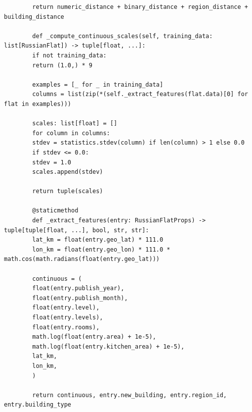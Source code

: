 \documentclass[12pt,a4paper]{article}
\begin{document}
\begin{lstlisting}
		return numeric_distance + binary_distance + region_distance + building_distance
		
		def _compute_continuous_scales(self, training_data: list[RussianFlat]) -> tuple[float, ...]:
		if not training_data:
		return (1.0,) * 9
		
		examples = [_ for _ in training_data]
		columns = list(zip(*(self._extract_features(flat.data)[0] for flat in examples)))
		
		scales: list[float] = []
		for column in columns:
		stdev = statistics.stdev(column) if len(column) > 1 else 0.0
		if stdev <= 0.0:
		stdev = 1.0
		scales.append(stdev)
		
		return tuple(scales)
		
		@staticmethod
		def _extract_features(entry: RussianFlatProps) -> tuple[tuple[float, ...], bool, str, str]:
		lat_km = float(entry.geo_lat) * 111.0
		lon_km = float(entry.geo_lon) * 111.0 * math.cos(math.radians(float(entry.geo_lat)))
		
		continuous = (
		float(entry.publish_year),
		float(entry.publish_month),
		float(entry.level),
		float(entry.levels),
		float(entry.rooms),
		math.log(float(entry.area) + 1e-5),
		math.log(float(entry.kitchen_area) + 1e-5),
		lat_km,
		lon_km,
		)
		
		return continuous, entry.new_building, entry.region_id, entry.building_type
	\end{lstlisting}
	
\end{document}

